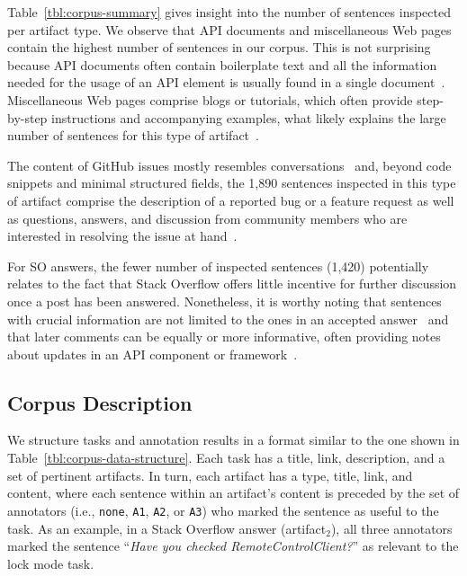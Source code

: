 Table~\ref{tbl:corpus-summary} gives insight into the number of sentences inspected per artifact type. 
We observe that API documents and miscellaneous Web pages contain the highest number of sentences in our corpus.
This is not surprising because API documents often contain boilerplate text 
and all the information needed for the usage of an API element is usually found in a single document~\cite{robillard2011field}.
Miscellaneous Web pages comprise blogs or tutorials, 
which often provide step-by-step instructions and accompanying examples, 
what likely explains the large number of sentences for this type of artifact~\cite{arya2020, Jiang2016b}.


The content of GitHub issues mostly resembles conversations~\cite{Rastkar2010}
and, beyond code snippets and minimal structured fields, the 
1,890 sentences inspected in this type of artifact comprise the description of a reported bug or a feature request as well as questions, answers, and discussion from  community members who are interested in resolving the issue at hand~\cite{zimmermann2010}.



For SO answers, the fewer number of inspected sentences (1,420) potentially relates to 
the fact that Stack Overflow offers little incentive for further discussion once a post has been answered.
Nonetheless, it is worthy noting that sentences with crucial information 
are not limited to the ones in an accepted answer~\cite{nadi2020}
and that later comments can be equally or more informative,
often providing notes about updates in an API component or framework~\cite{zhang2019so}.









\subsection{Corpus Description}



We structure tasks and annotation results in a format similar to the one shown in 
Table~\ref{tbl:corpus-data-structure}. 
Each task has a  title, link, description, and a set of pertinent artifacts.
In turn, each artifact has a type, title, link, and content,
where each sentence within an artifact's content
is preceded by the set of 
annotators (i.e., \texttt{none}, \texttt{A1}, \texttt{A2}, or \texttt{A3}) who marked the sentence as useful to the task.
As an example, in a Stack Overflow answer (artifact$_2$), all three annotators 
marked the sentence ``\textit{Have you checked RemoteControlClient?}''
as relevant to the lock mode task.

